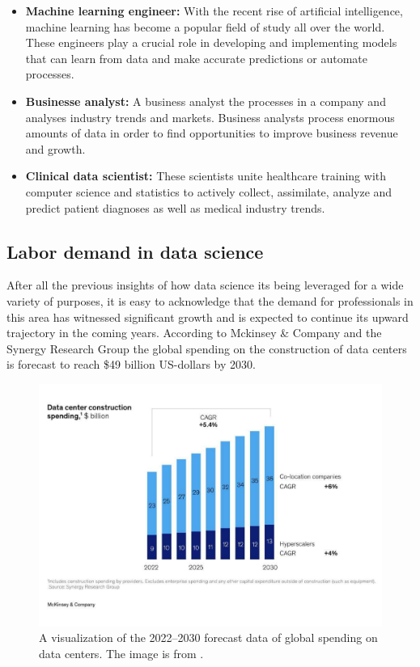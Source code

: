 \documentclass{vgtc}                          %
\begin{document}
\begin{itemize}
  \item \textbf{Machine learning engineer:} With the recent rise of artificial intelligence, machine learning has become a popular field of study all over the world. These engineers 
  play a crucial role in developing and implementing models that can learn from data and make accurate predictions or automate processes.
  \item \textbf{Businesse analyst:} A business analyst the processes in a company and analyses industry trends and markets. Business analysts process enormous amounts of data in order 
  to find opportunities to improve business revenue and growth.
  \item \textbf{Clinical data scientist:} These scientists unite healthcare training with computer science and statistics to actively collect, assimilate, analyze and predict patient 
  diagnoses as well as medical industry trends.
\end{itemize} 

\subsection{Labor demand in data science}

After all the previous insights of how data science its being leveraged for a wide variety of purposes, it is easy to acknowledge that the demand for professionals in this area has 
witnessed significant growth and is expected to continue its upward trajectory in the coming years. According to Mckinsey \& Company and the Synergy Research Group the global spending 
on the construction of data centers is forecast to reach \$49 billion US-dollars by 2030.\cite{Bangalore:2023}
\begin{figure}[h]
  \centering %
  \includegraphics[width=\columnwidth]{datacenter_spending}
  \caption{A visualization of the 2022--2030 forecast data of global spending on data centers. The image is from \cite{Bangalore:2023}.}
  \label{fig:sample}
\end{figure}
\end{document}
